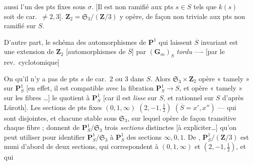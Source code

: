 \documentclass[11pt,a4paper]{article}
\begin{document}
\struck{\ill{}}  aussi  l'un des pts
fixes sous $\sigma$.
[Il est non ramifié  aux pts $s\in S$ tels que $k(s)$ soit de car.\ $\neq 2,3$]. $\mathbf{Z}_2 =
\mathfrak{S}_3/(\mathbf{Z}/3)$ y opère, de façon non triviale aux pts  non ramifié sur $S$.

D'autre part, le schéma  des automorphismes de
$\mathbf{P}^1$ qui laissent $\overline{S}$ \struck{\ill{}} invariant est une
extension de $\mathbf{Z}_2$ [automorphismes de $\overline{S}$] par
$(\mathbf{G}_m)_S$ \emph{tordu} ---- [par le rev.\ cyclotomique]



On   qu'il n'y a pas de pts $s$ de
car.\ $2$ ou $3$ dans $S$. Alors  $\mathfrak{S}_3\times
\mathbf{Z}_2$ opère « tamely » sur $\mathbf{P}^1_S$ [en effet, il est compatible
avec la fibration $\mathbf{P}^1_S\to S$, et opère « tamely » sur les fibres
\ldots] le quotient   \ill{} à $\mathbf{P}^1_S$ [car il est \emph{lisse}
sur $S$, et rationnel sur $S$ d'après Lüroth]. Les sections de pts fixes
$(0,1,\infty)$ $(2,-1,\tfrac12)$ $(\overline{S}=x',x'')$ --- qui sont
disjointes, et chacune stable sous $\mathfrak{S}_3$,  sur lequel  opère de façon \struck{\ill{}}
transitive  chaque fibre ; donnent \ill{} \ill{} \ill{} de
$\mathbf{P}^1_S/\mathfrak{S}_3$ trois \emph{sections} distinctes [à
expliciter\ldots] qu'on peut utiliser pour identifier
$\mathbf{P}^1_S/\mathfrak{S}_3$ à $\mathbf{P}^1_S$  des
sections $\infty,0,1$. De ,  $\mathbf{P}^1_S/(\mathbf{Z}/3)$ est muni d'abord de deux sections,
qui correspondent à $(0,1,\infty)$ et $(2,-1,\tfrac12)$, et qui
\end{document}
